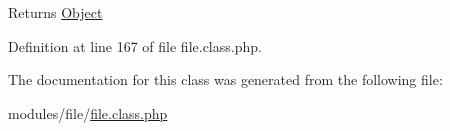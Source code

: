 \begin{DoxyReturn}{Returns}
\hyperlink{classObject}{Object} 
\end{DoxyReturn}


Definition at line 167 of file file.\-class.\-php.



The documentation for this class was generated from the following file\-:\begin{DoxyCompactItemize}
\item 
modules/file/\hyperlink{file_8class_8php}{file.\-class.\-php}\end{DoxyCompactItemize}
